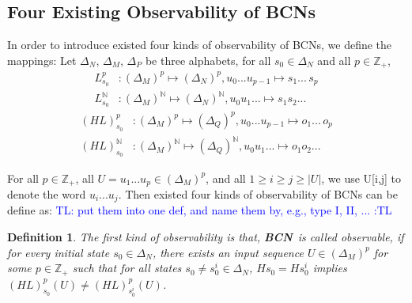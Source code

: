 \documentclass[letterpaper, 10 pt, conference]{ieeeconf}  %
\newtheorem{definition}{Definition}
\def \BCN {{\bf BCN}}
\newcommand{\tl}[1]{\textcolor{blue} {TL: #1 :TL} }
\begin{document}
\subsection{Four Existing Observability of BCNs}
In order to introduce existed four kinds of observability of BCNs, we define the mappings: Let $\Delta_N$, $\Delta_M$, $\Delta_P$ be three alphabets, for all $s_0\in \Delta_N$ and all $p\in \mathbb{Z}_+$,
\begin{equation}
\begin{split}
L^p_{s_0} &: (\Delta_M)^p\mapsto(\Delta_N)^p, u_0 . . . u_{p-1} \mapsto s_1 . . .\, s_p\\
L^{\mathbb{N}}_{s_0} &: (\Delta_M)^{\mathbb{N}}\mapsto(\Delta_N)^{\mathbb{N}}, u_0 u_1 . . .  \mapsto s_1 s_2 . . .
\end{split}
\end{equation}
\begin{equation}
\begin{split}
(HL)^p_{s_0} &: (\Delta_M)^p\mapsto(\Delta_Q)^p, u_0 . . . u_{p-1} \mapsto o_1 . . .\, o_p\\
(HL)^{\mathbb{N}}_{s_0} &: (\Delta_M)^{\mathbb{N}}\mapsto(\Delta_Q)^{\mathbb{N}}, u_0 u_1 . . .  \mapsto o_1 o_2 . . .
\end{split}
\end{equation}

For all  $p\in \mathbb{Z}_+$, all $U=u_1 ... u_p \in(\Delta_M)^p$, and all $1\ge i \ge j \ge |U|$, we use U[i,j] to denote the word $u_i ... u_j$. Then existed four kinds of observability of BCNs can be define as: 
\tl{put them  into one def, and name them by, e.g., type I, II, ...}

\begin{definition}
The first kind of observability is that, \BCN\ is called observable, if for every initial state $s_0 \in \Delta_N$, there exists an input sequence $U\in(\Delta_M)^p$ for some $p\in \mathbb{Z}_+$ such that for all states $s_0\neq s^i_0\in \Delta_N$, $Hs_0=Hs^i_0$ implies $(HL)^p_{s_0}(U)\neq (HL)^p_{s^i_0}(U)$.
\end{definition}
\end{document}
